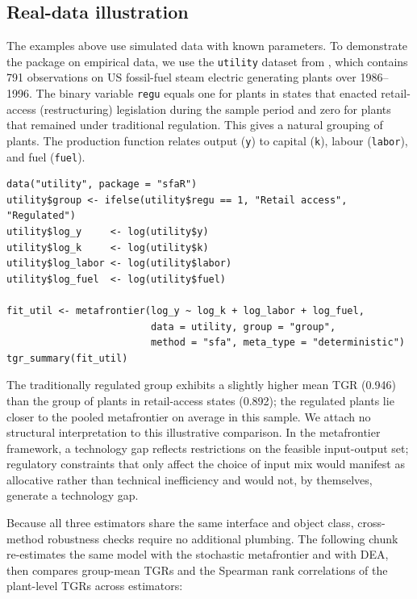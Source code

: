 \subsection{Real-data illustration}\label{sec:real-data}

The examples above use simulated data with known parameters. To demonstrate
the package on empirical data, we use the \texttt{utility} dataset from
, which contains 791 observations on US fossil-fuel steam
electric generating plants over 1986--1996. The binary variable \texttt{regu}
equals one for plants in states that enacted retail-access (restructuring)
legislation during the sample period and zero for plants that remained
under traditional regulation. This gives a natural grouping of plants. The
production function relates output (\texttt{y}) to capital (\texttt{k}), labour (\texttt{labor}),
and fuel (\texttt{fuel}).

\begin{verbatim}
data("utility", package = "sfaR")
utility$group <- ifelse(utility$regu == 1, "Retail access", "Regulated")
utility$log_y     <- log(utility$y)
utility$log_k     <- log(utility$k)
utility$log_labor <- log(utility$labor)
utility$log_fuel  <- log(utility$fuel)

fit_util <- metafrontier(log_y ~ log_k + log_labor + log_fuel,
                         data = utility, group = "group",
                         method = "sfa", meta_type = "deterministic")
tgr_summary(fit_util)
\end{verbatim}

The traditionally regulated group exhibits a slightly higher mean TGR
(0.946) than the group of plants in retail-access states (0.892); the
regulated plants lie closer to the pooled metafrontier on average in this
sample. We attach no structural interpretation to this
illustrative comparison. In the metafrontier framework, a technology gap
reflects restrictions on the feasible input-output set; regulatory
constraints that only affect the choice of input mix would manifest as
allocative rather than technical inefficiency and would not, by
themselves, generate a technology gap.

Because all three estimators share the same interface and object class,
cross-method robustness checks require no additional plumbing. The
following chunk re-estimates the same model with the stochastic
metafrontier and with DEA, then compares group-mean TGRs and the Spearman
rank correlations of the plant-level TGRs across estimators:

